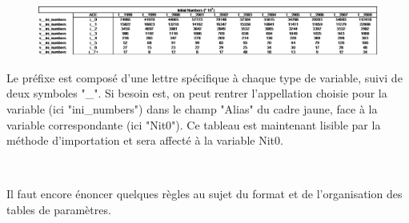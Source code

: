 \documentclass[12pt, colorinlistoftodos, notitlepage]{report}
\newenvironment{not used}[1]{%
    \longtable{%
        |>{\centering$\displaystyle}A{#1}{1}<{$}%
        |}\hline\ignorespaces}{%
    \endlongtable\ignorespacesafterend}
\begin{document}
\begin{figure}[h!]
    \begin{center}
    \includegraphics[width = \textwidth]{figures/param/stock4.png}
    \end{center}
    \label{fig:cancel}
\end{figure}
        
Le préfixe est composé d'une lettre spécifique à chaque type de variable, suivi de deux symboles "\_". Si besoin est, on peut rentrer l'appellation choisie pour la variable (ici "ini\_numbers") dans le champ "Alias" du cadre jaune, face à la variable correspondante (ici "Nit0"). Ce tableau est maintenant lisible par la méthode d'importation et sera affecté à la variable Nit0.

\par~\par

Il faut encore énoncer quelques règles au sujet du format et de l'organisation des tables de paramètres.
\end{document}
